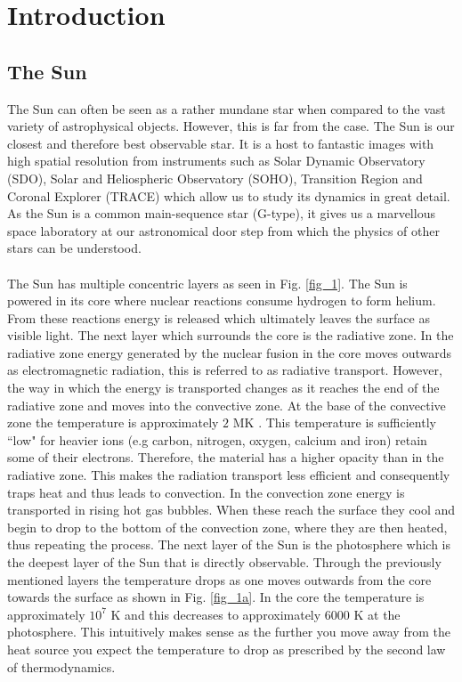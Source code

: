 \documentclass[12pt,a4paper,twoside]{article}
\begin{document}
\section{Introduction}
\subsection{The Sun}
The Sun can often be seen as a rather mundane star when compared to the vast variety of astrophysical objects. However, this is far from the case. The Sun is our closest and therefore best observable star. It is a host to fantastic images with high spatial resolution from instruments such as Solar Dynamic Observatory (SDO), Solar and Heliospheric Observatory (SOHO), Transition Region and Coronal Explorer (TRACE) which allow us to study its dynamics in great detail. As the Sun is a common main-sequence star (G-type), it gives us a marvellous space laboratory at our astronomical door step from which the physics of other stars can be understood. \\ \\
The Sun has multiple concentric layers as seen in Fig. \ref{fig_1}. The Sun is powered in its core where nuclear reactions consume hydrogen to form helium. From these reactions energy is released which ultimately leaves the surface as visible light. The next layer which surrounds the core is the radiative zone. In the radiative zone energy generated by the nuclear fusion in the core moves outwards as electromagnetic radiation, this is referred to as radiative transport. However, the way in which the energy is transported changes as it reaches the end of the radiative zone and moves into the convective zone. At the base of the convective zone the temperature is approximately $2$ MK \citep{mullan2009physics}. This temperature is sufficiently ``low" for heavier ions (e.g carbon, nitrogen, oxygen, calcium and iron) retain some of their electrons. Therefore, the material has a higher opacity than in the radiative zone. This makes the radiation transport less efficient and consequently traps heat and thus leads to convection. In the convection zone energy is transported in rising hot gas bubbles. When these reach the surface they cool and begin to drop to the bottom of the convection zone, where they are then heated, thus repeating the process. The next layer of the Sun is the photosphere which is the deepest layer of the Sun that is directly observable. Through the previously mentioned layers the temperature drops as one moves outwards from the core towards the surface as shown in Fig. \ref{fig_1a}. In the core the temperature is approximately $10^7$ K and this decreases to approximately $6000$ K at the photosphere. This intuitively makes sense as the further you move away from the heat source you expect the temperature to drop as prescribed by the second law of thermodynamics.
\end{document}
